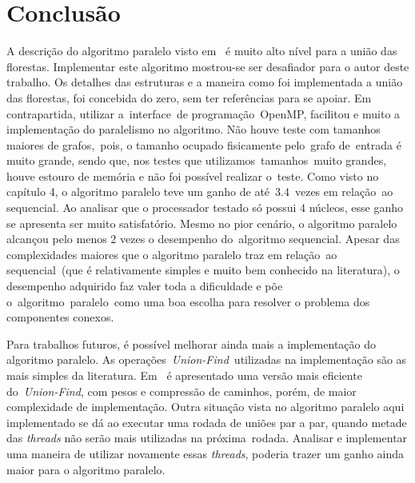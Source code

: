 \documentclass[12pt]{article}
\begin{document}
\section{Conclusão}

A descrição do algoritmo paralelo visto em~\cite{Grama:2003} é muito alto nível para a união das florestas. Implementar este algoritmo mostrou-se ser desafiador para o autor deste trabalho. Os detalhes das estruturas e a maneira como foi implementada a união das florestas, foi concebida do zero, sem ter referências para se apoiar. Em contrapartida, utilizar a interface de programação OpenMP, facilitou e muito a implementação do paralelismo no algoritmo. Não houve teste com tamanhos maiores de grafos, pois, o tamanho ocupado fisicamente pelo grafo de entrada é muito grande, sendo que, nos testes que utilizamos tamanhos muito grandes, houve estouro de memória e não foi possível realizar o teste.
\newpage
Como visto no capítulo 4, o algoritmo paralelo teve um ganho de até 3.4 vezes em relação ao sequencial. Ao analisar que o processador testado só possui 4 núcleos, esse ganho se apresenta ser muito satisfatório. Mesmo no pior cenário, o algoritmo paralelo alcançou pelo menos 2 vezes o desempenho do algoritmo sequencial. Apesar das complexidades maiores que o algoritmo paralelo traz em relação ao sequencial (que é relativamente simples e muito bem conhecido na literatura), o desempenho adquirido faz valer toda a dificuldade e põe o algoritmo paralelo como uma boa escolha para resolver o problema dos componentes conexos.

Para trabalhos futuros, é possível melhorar ainda mais a implementação do algoritmo paralelo. As operações \emph{Union-Find} utilizadas na implementação são as mais simples da literatura. Em~\cite{Sedgewick:2011} é apresentado uma versão mais eficiente do \emph{Union-Find}, com pesos e compressão de caminhos, porém, de maior complexidade de implementação. Outra situação vista no algoritmo paralelo aqui implementado se dá ao executar uma rodada de uniões par a par, quando metade das \emph{threads} não serão mais utilizadas na próxima rodada. Analisar e implementar uma maneira de utilizar novamente essas \emph{threads}, poderia trazer um ganho ainda maior para o algoritmo paralelo.



\end{document}
